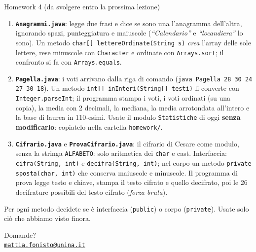 \documentclass[10pt,aspectratio=169]{beamer}
\begin{document}
\begin{frame}{Homework 4 (da svolgere entro la prossima lezione)}
\begin{enumerate}\itemsep=5pt
    \item \textbf{\texttt{Anagrammi.java}}: legge due frasi e dice se sono una l'anagramma dell'altra, ignorando spazi, punteggiatura e maiuscole (\emph{``Calendario''} e \emph{``locandiera''} lo sono). Un metodo \texttt{char[] lettereOrdinate(String s)} \emph{crea} l'array delle sole lettere, rese minuscole con \texttt{Character} e ordinate con \texttt{Arrays.sort}; il confronto si fa con \texttt{Arrays.equals}.
    \item \textbf{\texttt{Pagella.java}}: i voti arrivano dalla riga di comando (\texttt{java Pagella 28 30 24 27 30 18}). Un metodo \texttt{int[] inInteri(String[] testi)} li converte con \texttt{Integer.parseInt}; il programma stampa i voti, i voti ordinati (su una copia), la media con 2 decimali, la mediana, la media arrotondata all'intero e la base di laurea in 110-esimi. Usate il modulo \texttt{Statistiche} di oggi \textbf{senza modificarlo}: copiatelo nella cartella \texttt{homework/}.
    \item \textbf{\texttt{Cifrario.java}} e \textbf{\texttt{ProvaCifrario.java}}: il cifrario di Cesare come modulo, senza la stringa \texttt{ALFABETO}: solo aritmetica dei \texttt{char} e cast. Interfaccia: \texttt{cifra(String, int)} e \texttt{decifra(String, int)}; nel corpo un metodo \texttt{private} \texttt{sposta(char, int)} che conserva maiuscole e minuscole. Il programma di prova legge testo e chiave, stampa il testo cifrato e quello decifrato, poi le 26 decifrature possibili del testo cifrato (\emph{forza bruta}).
\end{enumerate}

\vspace{0.2cm}
\small Per ogni metodo decidete se è interfaccia (\texttt{public}) o corpo (\texttt{private}). Usate solo ciò che abbiamo visto finora.
\end{frame}

\begin{frame}
\begin{center}
{\Huge Domande?}\\[2.5em]
{\normalsize \href{mailto:mattia.fonisto@unina.it}{\texttt{mattia.fonisto@unina.it}}}
\end{center}
\end{frame}
\end{document}
